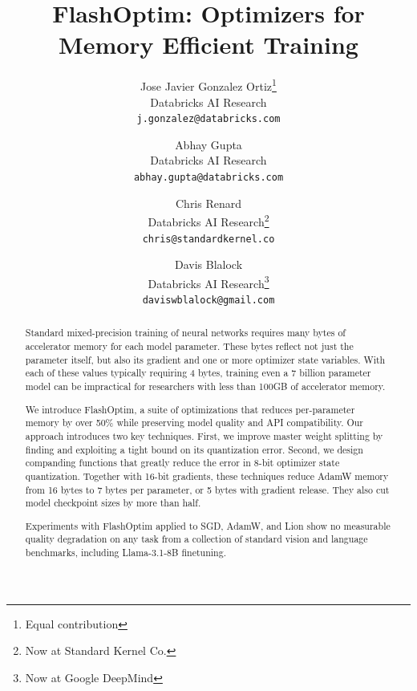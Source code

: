 \documentclass[10pt,twocolumn,letterpaper]{article}
\theoremstyle{plain}
\theoremstyle{definition}
\theoremstyle{remark}
\newcommand{\flashOptim}{FlashOptim\xspace}
\begin{document}
\title{FlashOptim: Optimizers for Memory Efficient Training}

\author{Jose Javier Gonzalez Ortiz\thanks{Equal contribution}\\
Databricks AI Research\\
{\tt\small j.gonzalez@databricks.com}
\and
Abhay Gupta\\
Databricks AI Research\\
{\tt\small abhay.gupta@databricks.com}
\and
Chris Renard\\
Databricks AI Research\thanks{Now at Standard Kernel Co.}\\
{\tt\small chris@standardkernel.co}
\and
Davis Blalock\footnotemark[1]\\
Databricks AI Research\thanks{Now at Google DeepMind}\\
{\tt\small daviswblalock@gmail.com}
}

\maketitle

\begin{abstract}

Standard mixed-precision training of neural networks requires many bytes of accelerator memory for each model parameter. These bytes reflect not just the parameter itself, but also its gradient and one or more optimizer state variables. With each of these values typically requiring 4 bytes, training even a 7 billion parameter model can be impractical for researchers with less than 100GB of accelerator memory.

We introduce \flashOptim, a suite of optimizations that reduces per-parameter memory by over 50\% while preserving model quality and API compatibility.
Our approach introduces two key techniques. First, we improve master weight splitting by finding and exploiting a tight bound on its quantization error. Second, we design companding functions that greatly reduce the error in 8-bit optimizer state quantization.
Together with 16-bit gradients, these techniques reduce AdamW memory from 16 bytes to 7 bytes per parameter, or 5 bytes with gradient release. They also cut model checkpoint sizes by more than half.

Experiments with \flashOptim applied to SGD, AdamW, and Lion show no measurable quality degradation on any task from a collection of standard vision and language benchmarks, including Llama-3.1-8B finetuning.

\end{abstract}
\end{document}
